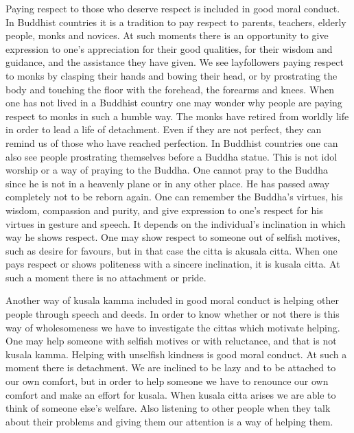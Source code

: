 \documentclass{book}
\begin{document}
Paying respect to those who deserve respect is included in good moral
conduct. In Buddhist countries it is a tradition to pay respect to
parents, teachers, elderly people, monks and novices. At such moments
there is an opportunity to give expression to one's appreciation for
their good qualities, for their wisdom and guidance, and the assistance
they have given. We see layfollowers paying respect to monks by clasping
their hands and bowing their head, or by prostrating the body and
touching the floor with the forehead, the forearms and knees. When one
has not lived in a Buddhist country one may wonder why people are paying
respect to monks in such a humble way. The monks have retired from
worldly life in order to lead a life of detachment. Even if they are not
perfect, they can remind us of those who have reached perfection. In
Buddhist countries one can also see people prostrating themselves before
a Buddha statue. This is not idol wor­ship or a way of praying to the
Buddha. One cannot pray to the Buddha since he is not in a heavenly
plane or in any other place. He has passed away completely not to be
reborn again. One can remember the Buddha's virtues, his wisdom,
compassion and purity, and give expression to one's respect for his
virtues in gesture and speech. It depends on the individual's
inclination in which way he shows respect. One may show respect to
someone out of selfish motives, such as desire for favours, but in that
case the citta is akusala citta. When one pays respect or shows
politeness with a sincere inclination, it is kusala citta. At such a
moment there is no attachment or pride.

Another way of kusala kamma included in good moral conduct is helping
other people through speech and deeds. In order to know whether or not       there is this way of wholesome­ness we have to investigate the cittas
which motivate helping. One may help someone with selfish motives or
with reluctance, and that is not kusala kamma. Helping with unselfish
kindness is good moral conduct. At such a moment there is detachment. We
are inclined to be lazy and to be attached to our own comfort, but in
order to help someone we have to renounce our own comfort and make an
effort for kusala. When kusala citta arises we are able to think of
someone else's welfare. Also listening to other people when they talk
about their problems and giving them our attention is a way of helping
them.
\end{document}
